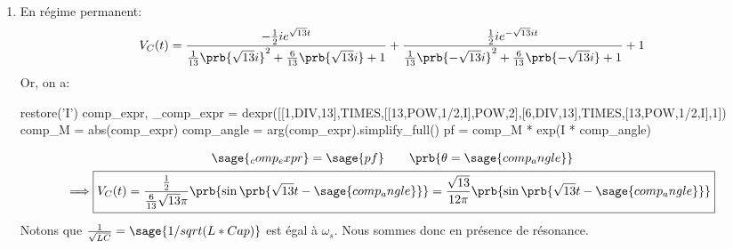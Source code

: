 \documentclass[12pt,titlepage]{article}
\begin{document}
\begin{enumerate}
\begin{itemize}
	      \end{itemize}
	\item En régime permanent:
	      \begin{gather*}
		      V_C(t)=\frac{-\frac{1}{2}ie^{\sqrt{13}t}}{\frac{1}{13}\prb{\sqrt{13}i}^2+\frac{6}{13}\prb{\sqrt{13}i}+1}+\frac{\frac{1}{2}ie^{-\sqrt{13}it}}{\frac{1}{13}\prb{-\sqrt{13}i}^2+\frac{6}{13}\prb{-\sqrt{13}i}+1}+1
	      \end{gather*}
	      Or, on a:
	      \begin{sagesilent}
		      restore('I')
		      comp_expr, _comp_expr = dexpr([[1,DIV,13],TIMES,[[13,POW,1/2,I],POW,2],[6,DIV,13],TIMES,[13,POW,1/2,I],1])
		      comp_M = abs(comp_expr)
		      comp_angle = arg(comp_expr).simplify_full()
		      pf = comp_M * exp(I * comp_angle)
	      \end{sagesilent}
	      \begin{gather*}
		      \sage{_comp_expr}=\sage{pf}\qquad\prb{\theta=\sage{comp_angle}}\\
		      \Longrightarrow\boxed{V_C(t)=\frac{\frac{1}{2}}{\frac{6}{13}\sqrt{13}\pi}\prb{\sin{\prb{\sqrt{13}t-\sage{comp_angle}}}}=\frac{\sqrt{13}}{12\pi}\prb{\sin{\prb{\sqrt{13}t-\sage{comp_angle}}}}}
	      \end{gather*}
	      Notons que $\frac{1}{\sqrt{LC}}=\sage{1/sqrt(L*Cap)}$ est égal à $\omega_s$. Nous sommes donc en présence de résonance.
\end{enumerate}
\end{document}
